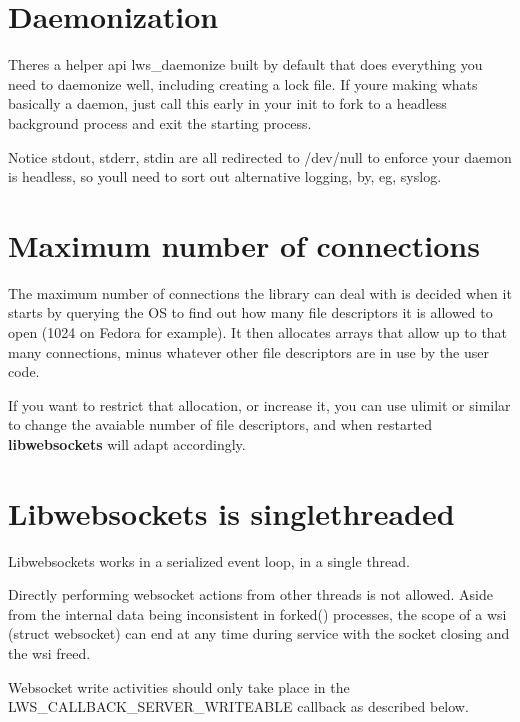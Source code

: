 \hypertarget{md_README.coding_dae}{}\section{Daemonization}\label{md_README.coding_dae}
There\textquotesingle{}s a helper api {\ttfamily lws\+\_\+daemonize} built by default that does everything you need to daemonize well, including creating a lock file. If you\textquotesingle{}re making what\textquotesingle{}s basically a daemon, just call this early in your init to fork to a headless background process and exit the starting process.

Notice stdout, stderr, stdin are all redirected to /dev/null to enforce your daemon is headless, so you\textquotesingle{}ll need to sort out alternative logging, by, eg, syslog.\hypertarget{md_README.coding_conns}{}\section{Maximum number of connections}\label{md_README.coding_conns}
The maximum number of connections the library can deal with is decided when it starts by querying the OS to find out how many file descriptors it is allowed to open (1024 on Fedora for example). It then allocates arrays that allow up to that many connections, minus whatever other file descriptors are in use by the user code.

If you want to restrict that allocation, or increase it, you can use ulimit or similar to change the avaiable number of file descriptors, and when restarted {\bfseries libwebsockets} will adapt accordingly.\hypertarget{md_README.coding_evtloop}{}\section{Libwebsockets is singlethreaded}\label{md_README.coding_evtloop}
Libwebsockets works in a serialized event loop, in a single thread.

Directly performing websocket actions from other threads is not allowed. Aside from the internal data being inconsistent in {\ttfamily forked()} processes, the scope of a {\ttfamily wsi} ({\ttfamily struct websocket}) can end at any time during service with the socket closing and the {\ttfamily wsi} freed.

Websocket write activities should only take place in the {\ttfamily L\+W\+S\+\_\+\+C\+A\+L\+L\+B\+A\+C\+K\+\_\+\+S\+E\+R\+V\+E\+R\+\_\+\+W\+R\+I\+T\+E\+A\+B\+LE} callback as described below.

